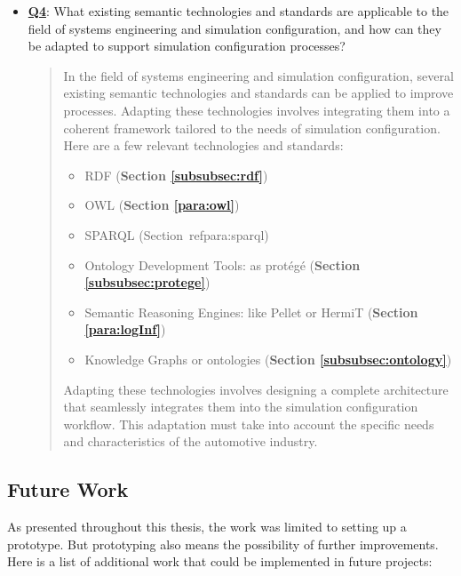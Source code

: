 \begin{itemize}
    \item \hyperref[Q4]{\textbf{Q4}}: What existing semantic technologies and standards are applicable to the field of systems engineering and simulation configuration, and how can they be adapted to support simulation configuration processes?
    \begin{quote}
        In the field of systems engineering and simulation configuration, several existing semantic technologies and standards can be applied to improve processes. Adapting these technologies involves integrating them into a coherent framework tailored to the needs of simulation configuration. Here are a few relevant technologies and standards:
         \begin{itemize}
             \item RDF (\textbf{Section \ref{subsubsec:rdf}})
             \item OWL (\textbf{Section \ref{para:owl}})
             \item SPARQL (Section\ ref{para:sparql})
             \item Ontology Development Tools: as protégé (\textbf{Section \ref{subsubsec:protege}})
             \item Semantic Reasoning Engines: like Pellet or HermiT (\textbf{Section \ref{para:logInf}})
             \item Knowledge Graphs or ontologies (\textbf{Section \ref{subsubsec:ontology}})
         \end{itemize}
        
        Adapting these technologies involves designing a complete architecture that seamlessly integrates them into the simulation configuration workflow. This adaptation must take into account the specific needs and characteristics of the automotive industry.
    \end{quote}
\end{itemize}


 
\subsection{Future Work}
As presented throughout this thesis, the work was limited to setting up a prototype. But prototyping also means the possibility of further improvements. Here is a list of additional work that could be implemented in future projects:

